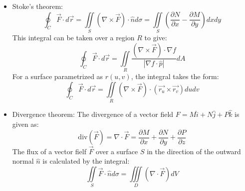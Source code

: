 \documentclass[a4paper]{article}
\begin{document}
\begin{itemize}
    \item Stoke's theorem:
        \begin{equation*}
            \oint_{C}\overrightarrow{F}\cdot d\vec{r} = \iint\limits_S(\nabla\times\overrightarrow{F})\cdot\hat{n}d\sigma = \iint\limits_S\left(\frac{\partial N}{\partial x}-\frac{\partial M}{\partial y}\right)dxdy
        \end{equation*}
        This integral can be taken over a region $R$ to give:
        \begin{equation*}
             \oint_{C}\overrightarrow{F}\cdot d\vec{r} = \iint\limits_R\frac{(\nabla\times\overrightarrow{F})\cdot\nabla f}{|\nabla f\cdot\hat{p}|}dA
        \end{equation*}
        For a surface parametrized as $r(u,v)$, the integral takes the form:
        \begin{equation*}
             \oint_{C}\overrightarrow{F}\cdot d\vec{r} = \iint\limits_R(\nabla\times\overrightarrow{F})\cdot(\vec{r_u}\times\vec{r_v})dudv
        \end{equation*}
    
    \item Divergence theorem: The divergence of a vector field $F=M\hat{i}+N\hat{j}+P\hat{k}$ is given as:
    \begin{equation*}
        \text{div}(\overrightarrow{F}) = \nabla\cdot\overrightarrow{F} = \frac{\partial M}{\partial x}+\frac{\partial N}{\partial y}+\frac{\partial P}{\partial z} 
    \end{equation*}
    The flux of a vector fielf $\overrightarrow{F}$ over a surface $S$ in the direction of the outward normal $\hat{n}$ is calculated by the integral:
    \begin{equation*}
        \iint\limits_S\overrightarrow{F}\cdot\hat{n}d\sigma = \iiint\limits_D(\nabla\cdot\overrightarrow{F})dV
    \end{equation*}
\end{itemize}
\end{document}
